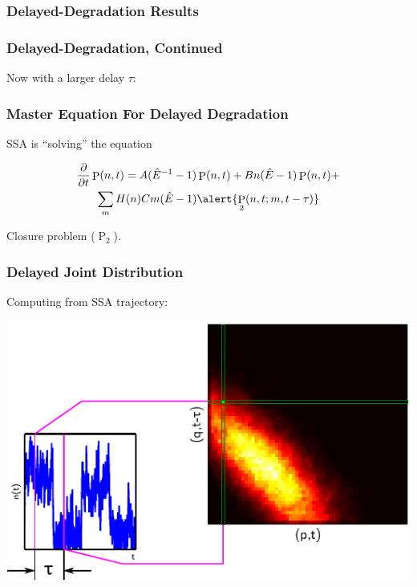 \documentclass[xcolor={usenames,dvipsnames,svgnames},url=hyphens]{beamer}
\DeclareMathOperator{\Prob}{P}
\begin{document}
\begin{frame}
    \frametitle{Delayed-Degradation Results}
    \begin{center}
        \resizebox{0.48\textwidth}{!}{
            
        }
        \resizebox{0.48\textwidth}{!}{
            
        }
    \end{center}
\end{frame}

\begin{frame}
    \frametitle{Delayed-Degradation, Continued}
    Now with a larger delay $\tau$:

    \begin{center}
        \resizebox{0.48\textwidth}{!}{
            
        }
        \resizebox{0.48\textwidth}{!}{
            
        }
    \end{center}
\end{frame}

\begin{frame}
    \frametitle{Master Equation For Delayed Degradation}

    SSA is ``solving'' the equation

    \begin{multline*}
        \frac{\partial}{\partial t} \Prob(n, t) = A(\hat{E}^{-1} - 1) \Prob(n, t) + B n(\hat{E} - 1) \Prob(n, t) + \\
        \sum_m H(n) C m (\hat{E} - 1) \alert{\Prob_2(n, t; m, t - \tau)}
    \end{multline*}

    Closure problem  ($\Prob_2$).
\end{frame}

\begin{frame}
    \frametitle{Delayed Joint Distribution}
    Computing from SSA trajectory:

    \begin{center}
        \includegraphics{figures/jd-illustration.pdf}
    \end{center}
\end{frame}
\end{document}
